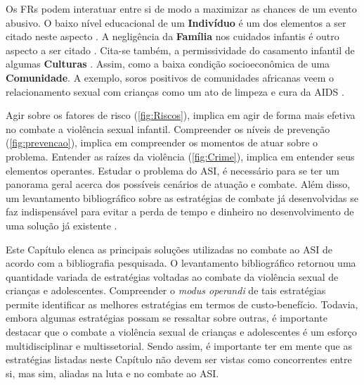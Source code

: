 Os \acp{FR} podem interatuar entre si de modo a maximizar as chances de um evento abusivo. O baixo nível educacional de um \textbf{Indivíduo} é um dos elementos a ser citado neste aspecto \cite{dahlberg2006violencia}. A negligência da \textbf{Família} nos cuidados infantis é outro aspecto a ser citado \cite{blasco2018abuso}. Cita-se também, a permissividade do casamento infantil de algumas \textbf{Culturas} \cite{bandiera2020women}. Assim, como a baixa condição socioeconômica de uma \textbf{Comunidade}. A exemplo, soros positivos de comunidades africanas veem o relacionamento sexual com crianças como um ato de limpeza e cura da \ac{AIDS} \cite{aded2006abuso}.

Agir sobre os fatores de risco (\autoref{fig:Riscos}), implica em agir de forma mais efetiva no combate a violência sexual infantil. Compreender os níveis de prevenção (\autoref{fig:prevencao}), implica em compreender os momentos de atuar sobre o problema. Entender as raízes da violência (\autoref{fig:Crime}), implica em entender seus elementos operantes. Estudar o problema do \ac{ASI}, é necessário para se ter um panorama geral acerca dos possíveis cenários de atuação e combate. Além disso, um levantamento bibliográfico sobre as estratégias de combate já desenvolvidas se faz indispensável para evitar a perda de tempo e dinheiro no desenvolvimento de uma solução já existente \cite{wazlawick2014metodologia}. 

Este Capítulo elenca as principais soluções utilizadas no combate ao \ac{ASI} de acordo com a bibliografia pesquisada. O levantamento bibliográfico retornou uma quantidade variada de estratégias voltadas ao combate da violência sexual de crianças e adolescentes. Compreender o \textit{modus operandi} de tais estratégias permite identificar as melhores estratégias em termos de custo-benefício. Todavia, embora algumas estratégias possam se ressaltar sobre outras, é importante destacar que o combate a violência sexual de crianças e adolescentes é um esforço multidisciplinar e multissetorial. Sendo assim, é importante ter em mente que as estratégias listadas neste Capítulo não devem ser vistas como concorrentes entre si, mas sim, aliadas na luta e no combate ao \ac{ASI}.

